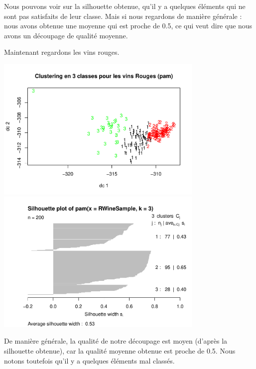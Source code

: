 \documentclass[
]{article}
\begin{document}
Nous pouvons voir sur la silhouette obtenue, qu'il y a quelques éléments
qui ne sont pas satisfaits de leur classe. Mais si nous regardons de
manière générale : nous avons obtenue une moyenne qui est proche de 0.5,
ce qui veut dire que nous avons un découpage de qualité moyenne.

Maintenant regardons les vins rouges.
\begin{center}
	\includegraphics[width=10cm]{repport_files/figure-latex/unnamed-chunk-13-1.pdf}
\includegraphics[width=10cm]{repport_files/figure-latex/unnamed-chunk-13-2.pdf}
\end{center} De
manière générale, la qualité de notre découpage est moyen (d'après la
silhouette obtenue), car la qualité moyenne obtenue est proche de 0.5.
Nous notons toutefois qu'il y a quelques éléments mal classés.
\end{document}
